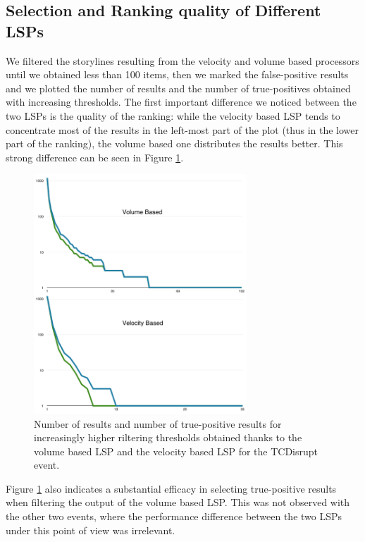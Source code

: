 \documentclass{sig-alternate}
\begin{document}
\subsection{Selection and Ranking quality of Different LSPs}
\label{sec:selection_and_ranking_quality}
We filtered the storylines resulting from the velocity and volume based processors until we obtained less than 100 items, then we marked the false-positive results and we plotted the number of results and the number of true-positives obtained with increasing thresholds. The first important difference we noticed between the two LSPs is the quality of the ranking: while the velocity based LSP tends to concentrate most of the results in the left-most part of the plot (thus in the lower part of the ranking), the volume based one distributes the results better. This strong difference can be seen in Figure \ref{fig:tcdisrupt_plots}.
\begin{figure}[htbp]
  \centering
  \includegraphics[width=8cm]{Figures/tcdisrupt_plots.png}
  \caption{Number of results and number of true-positive results for increasingly higher riltering thresholds obtained thanks to the volume based LSP and the velocity based LSP for the TCDisrupt event. }
  \label{fig:tcdisrupt_plots}
\end{figure}

Figure \ref{fig:tcdisrupt_plots} also indicates a substantial efficacy in selecting true-positive results when filtering the output of the volume based LSP. This was not observed with the other two events, where the performance difference between the two LSPs under this point of view was irrelevant.
\end{document}
